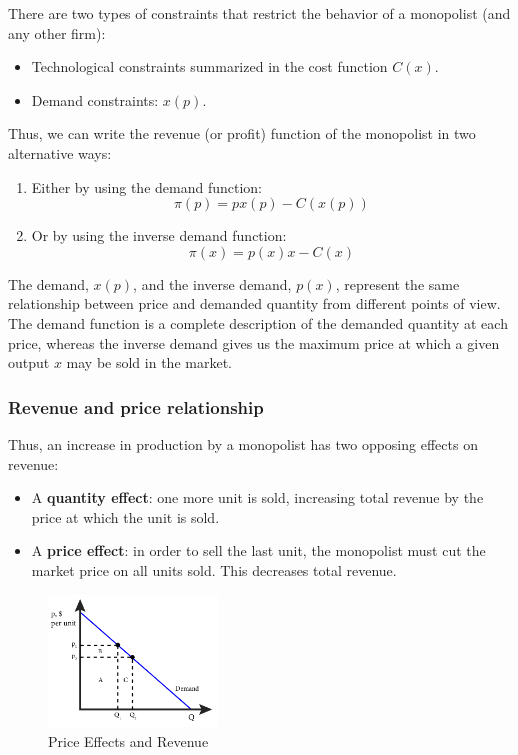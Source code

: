 \documentclass[
  12pt,
  oneside]{book}
\providecommand{\tightlist}{%
  \setlength{\itemsep}{0pt}\setlength{\parskip}{0pt}}
\theoremstyle{definition}
\theoremstyle{definition}
\theoremstyle{definition}
\theoremstyle{definition}
\theoremstyle{remark}
\begin{document}
There are two types of constraints that restrict the behavior of a monopolist (and any other firm):

\begin{itemize}
\tightlist
\item
  Technological constraints summarized in the cost function \(C(x)\).
\item
  Demand constraints: \(x(p)\).
\end{itemize}

Thus, we can write the revenue (or profit) function of the monopolist in two alternative ways:

\begin{enumerate}
\def\labelenumi{\arabic{enumi}.}
\item
  Either by using the demand function:
  \[
  \pi(p) = px(p) - C(x(p))
  \]
\item
  Or by using the inverse demand function:
  \[
  \pi(x) = p(x)x - C(x)
  \]
\end{enumerate}

The demand, \(x(p)\), and the inverse demand, \(p(x)\), represent the same relationship between price and demanded quantity from different points of view. The demand function is a complete description of the demanded quantity at each price, whereas the inverse demand gives us the maximum price at which a given output \(x\) may be sold in the market.

\hypertarget{revenue-and-price-relationship}{%
\subsubsection*{Revenue and price relationship}\label{revenue-and-price-relationship}}

Thus, an increase in production by a monopolist has two opposing effects on revenue:

\begin{itemize}
\tightlist
\item
  A \textbf{quantity effect}: one more unit is sold, increasing total revenue by the price at which the unit is sold.
\item
  A \textbf{price effect}: in order to sell the last unit, the monopolist must cut the market price on all units sold. This decreases total revenue.
\end{itemize}

\begin{figure}
\centering
\includegraphics[width=0.4\textwidth,height=\textheight]{fig/revenue-mono.png}
\caption[\label{fig:revenue-mono} Price Effects and Revenue]{\label{fig:revenue-mono} Price Effects and Revenue\footnotemark{}}
\end{figure}
\end{document}
